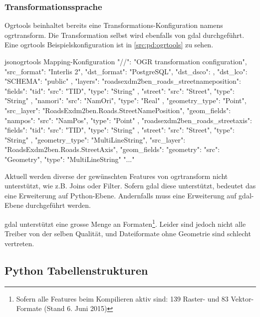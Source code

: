 \subsubsection{Transformationssprache}
Ogrtools beinhaltet bereits eine Transformations-Konfiguration namens ogrtransform. Die Transformation selbst wird ebenfalls von \gls{gdal} durchgeführt.
Eine ogrtools Beispielskonfiguration \cite[README, ogrtransform library]{ogrtools} ist in \cref{src:pd:ogrtools} zu sehen.

\begin{srclst}[label=src:pd:ogrtools]{json}{ogrtools Mapping-Konfiguration}
{
  "//": "OGR transformation configuration",
  "src_format": "Interlis 2",
  "dst_format": "PostgreSQL",
  "dst_dsco": {},
  "dst_lco": {
    "SCHEMA": "public"
  },
  "layers": {
    "roadsexdm2ben_roads_streetnameposition": {
      "fields": {
        "tid": {
          "src": "TID",
          "type": "String"
        },
        "street": {
          "src": "Street",
          "type": "String"
        },
        "namori": {
          "src": "NamOri",
          "type": "Real"
        }
      },
      "geometry_type": "Point",
      "src_layer": "RoadsExdm2ben.Roads.StreetNamePosition",
      "geom_fields": {
        "nampos": {
          "src": "NamPos",
          "type": "Point"
        }
      }
    },
    "roadsexdm2ben_roads_streetaxis": {
      "fields": {
        "tid": {
          "src": "TID",
          "type": "String"
        },
        "street": {
          "src": "Street",
          "type": "String"
        }
      },
      "geometry_type": "MultiLineString",
      "src_layer": "RoadsExdm2ben.Roads.StreetAxis",
      "geom_fields": {
        "geometry": {
          "src": "Geometry",
          "type": "MultiLineString"
        }
      }
    }
  }
  "..."
}
\end{srclst}

Aktuell werden diverse der gewünschten Features von ogrtransform nicht unterstützt, wie z.B. Joins oder Filter. Sofern \gls{gdal} diese unterstützt, bedeutet das eine Erweiterung auf Python-Ebene. Andernfalls muss eine Erweiterung auf \gls{gdal}-Ebene durchgeführt werden.

\gls{gdal} unterstützt eine grosse Menge an Formaten\footnote{Sofern alle Features beim Kompilieren aktiv sind: 139 Raster- und 83 Vektor-Formate (Stand 6. Juni 2015)}. Leider sind jedoch nicht alle Treiber von der selben Qualität, und Dateiformate ohne Geometrie sind schlecht vertreten.

\subsection{Python Tabellenstrukturen}

